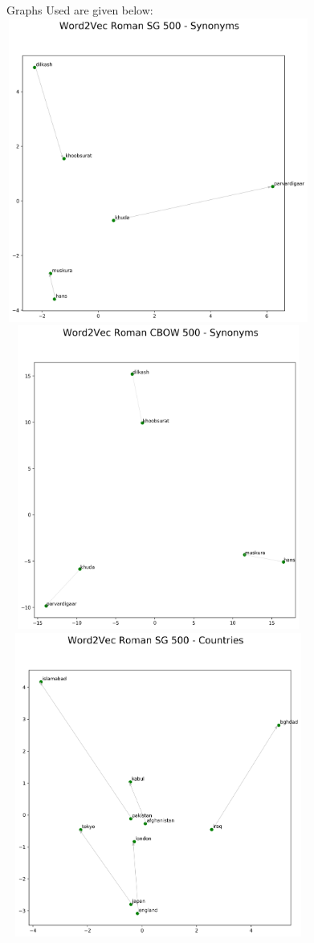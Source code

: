 \documentclass[format=acmsmall,review=true,screen=true]{acmart}
\begin{document}
Graphs Used are given below:\\

\includegraphics[width=10cm,height=10cm,keepaspectratio]{word2vec-sg_roman-urdu_synonyms.png}\\
\newpage
\includegraphics[width=10cm,height=10cm,keepaspectratio]{word2vec-cbow_roman-urdu_synonyms.png} \\
\includegraphics[width=10cm,height=10cm,keepaspectratio]{word2vec-sg_roman-urdu_countries.png} \\
\end{document}
